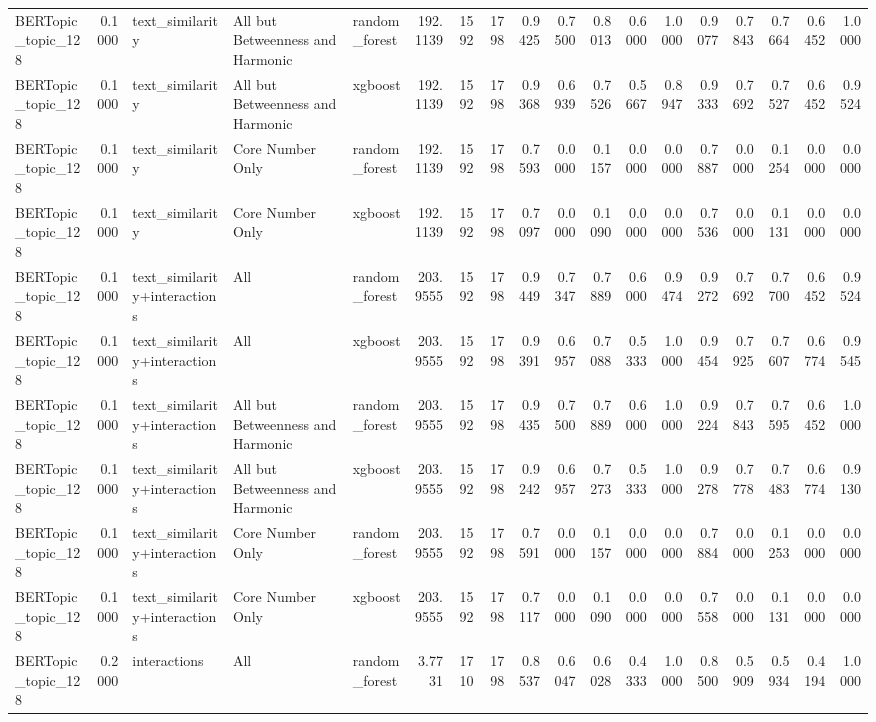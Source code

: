 \begin{tabular}{lrlllrrrrrrrrrrrrr}
BERTopic_topic_128 & 0.1000 & text_similarity & All but Betweenness and Harmonic & random_forest & 192.1139 & 1592 & 1798 & 0.9425 & 0.7500 & 0.8013 & 0.6000 & 1.0000 & 0.9077 & 0.7843 & 0.7664 & 0.6452 & 1.0000 \\
BERTopic_topic_128 & 0.1000 & text_similarity & All but Betweenness and Harmonic & xgboost & 192.1139 & 1592 & 1798 & 0.9368 & 0.6939 & 0.7526 & 0.5667 & 0.8947 & 0.9333 & 0.7692 & 0.7527 & 0.6452 & 0.9524 \\
BERTopic_topic_128 & 0.1000 & text_similarity & Core Number Only & random_forest & 192.1139 & 1592 & 1798 & 0.7593 & 0.0000 & 0.1157 & 0.0000 & 0.0000 & 0.7887 & 0.0000 & 0.1254 & 0.0000 & 0.0000 \\
BERTopic_topic_128 & 0.1000 & text_similarity & Core Number Only & xgboost & 192.1139 & 1592 & 1798 & 0.7097 & 0.0000 & 0.1090 & 0.0000 & 0.0000 & 0.7536 & 0.0000 & 0.1131 & 0.0000 & 0.0000 \\
BERTopic_topic_128 & 0.1000 & text_similarity+interactions & All & random_forest & 203.9555 & 1592 & 1798 & 0.9449 & 0.7347 & 0.7889 & 0.6000 & 0.9474 & 0.9272 & 0.7692 & 0.7700 & 0.6452 & 0.9524 \\
BERTopic_topic_128 & 0.1000 & text_similarity+interactions & All & xgboost & 203.9555 & 1592 & 1798 & 0.9391 & 0.6957 & 0.7088 & 0.5333 & 1.0000 & 0.9454 & 0.7925 & 0.7607 & 0.6774 & 0.9545 \\
BERTopic_topic_128 & 0.1000 & text_similarity+interactions & All but Betweenness and Harmonic & random_forest & 203.9555 & 1592 & 1798 & 0.9435 & 0.7500 & 0.7889 & 0.6000 & 1.0000 & 0.9224 & 0.7843 & 0.7595 & 0.6452 & 1.0000 \\
BERTopic_topic_128 & 0.1000 & text_similarity+interactions & All but Betweenness and Harmonic & xgboost & 203.9555 & 1592 & 1798 & 0.9242 & 0.6957 & 0.7273 & 0.5333 & 1.0000 & 0.9278 & 0.7778 & 0.7483 & 0.6774 & 0.9130 \\
BERTopic_topic_128 & 0.1000 & text_similarity+interactions & Core Number Only & random_forest & 203.9555 & 1592 & 1798 & 0.7591 & 0.0000 & 0.1157 & 0.0000 & 0.0000 & 0.7884 & 0.0000 & 0.1253 & 0.0000 & 0.0000 \\
BERTopic_topic_128 & 0.1000 & text_similarity+interactions & Core Number Only & xgboost & 203.9555 & 1592 & 1798 & 0.7117 & 0.0000 & 0.1090 & 0.0000 & 0.0000 & 0.7558 & 0.0000 & 0.1131 & 0.0000 & 0.0000 \\
BERTopic_topic_128 & 0.2000 & interactions & All & random_forest & 3.7731 & 1710 & 1798 & 0.8537 & 0.6047 & 0.6028 & 0.4333 & 1.0000 & 0.8500 & 0.5909 & 0.5934 & 0.4194 & 1.0000 \\

\end{tabular}
